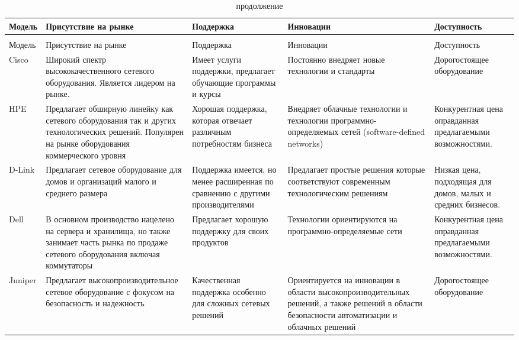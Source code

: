 \begin{longtable}{
    | >{\raggedright}m{}
    | >{\raggedright\arraybackslash}m{}
    | >{\raggedright\arraybackslash}m{}
    | >{\raggedright\arraybackslash}m{}
    | >{\raggedright\arraybackslash}m{}|}
    
    \caption{Характеристики производителя}
    \label{table:func:Manufacturer} \\
    \hline
    \centering Модель
    & \centering\arraybackslash Присутствие на рынке
    & \centering\arraybackslash Поддержка 
    & \centering\arraybackslash Инновации
    & \centering\arraybackslash Доступность \\
    \hline
    \endfirsthead

    \caption{продолжение} \\
    \hline
    \centering Модель
    & \centering\arraybackslash Присутствие на рынке
    & \centering\arraybackslash Поддержка 
    & \centering\arraybackslash Инновации
    & \centering\arraybackslash Доступность \\
    \hline
    \endhead
   
    Cisco &
    Широкий спектр высококачественного сетевого оборудования. Является лидером на рынке. & 
    Имеет услуги поддержки, предлагает обучающие программы и курсы~\cite{Cisco_trainin_certifications} & 
    Постоянно внедряет новые технологии и стандарты &
    Дорогостоящее оборудование
    \\
    \hline
    HPE &
    Предлагает обширную линейку как сетевого оборудования так и других технологических решений. Популярен на рынке 
    оборудования коммерческого уровня &
    Хорошая поддержка, которая отвечает различным потребностям бизнеса & 
    Внедряет облачные технологии  и технологии программно-определяемых сетей (software-defined networks)~\cite{hpesdn} &
    Конкурентная цена оправданная предлагаемыми возможностями.
    \\
    \hline
    D-Link & 
    Предлагает сетевое оборудование для домов и организаций малого и среднего размера & 
    Поддержка имеется, но менее расширенная по сравнению с другими производителями & 
    Предлагает простые решения которые соответствуют современным технологическим решениям & 
    Низкая цена, подходящая для домов, малых и средних бизнесов.
    \\
    \hline
    Dell & 
    В основном производство нацелено на сервера и хранилища, но также занимает часть рынка по продаже сетевого оборудования включая коммутаторы & 
    Предлагает хорошую поддержку для своих продуктов & 
    Технологии ориентируются на программно-определяемые сети~\cite{dellsdn} & 
    Конкурентная цена оправданная предлагаемыми возможностями.
    \\
    \hline
    Juniper & 
    Предлагает высокопроизводительное сетевое оборудование с фокусом на безопасность и надежность & 
    Качественная поддержка особенно для сложных сетевых решений & 
    Ориентируется на инновации в области высокопроизводительных решений, а также решений в области безопасности автоматизации и облачных решений & 
    Дорогостоящее оборудование
    \\
    \hline
\end{longtable} 

